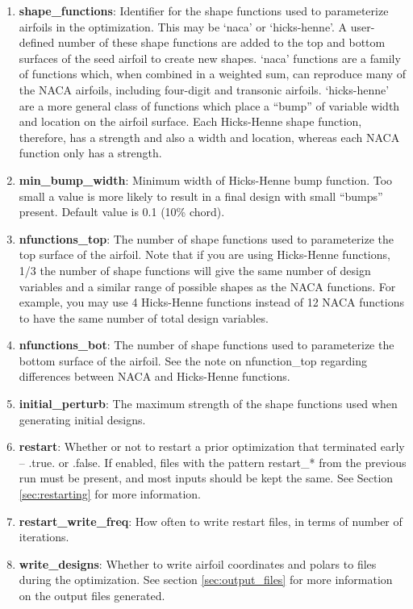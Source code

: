 \documentclass[11pt]{article}
\begin{document}
\begin{enumerate}
{as a percentage of the chord length; the second digit is for location of max camber, in
tenths of the chord length, and the last two digits are for max thickness, as a percentage
of chord length.}
\item{\textbf{shape\_functions}: Identifier for the shape functions used to parameterize
airfoils in the optimization.  This may be `naca' or `hicks-henne'.  A user-defined number
of these shape functions are added to the top and bottom surfaces of the seed airfoil to
create new shapes.  `naca' functions are a family of functions which, when combined in a
weighted sum, can reproduce many of the NACA airfoils, including four-digit and transonic
airfoils.  `hicks-henne' are a more general class of functions which place a ``bump'' of
variable width and location on the airfoil surface.  Each Hicks-Henne shape function,
therefore, has a strength and also a width and location, whereas each NACA function only
has a strength.}
\item{\textbf{min\_bump\_width}: Minimum width of Hicks-Henne bump function.  Too small a
value is more likely to result in a final design with small ``bumps'' present.  Default
value is 0.1 (10\% chord).}
\item{\textbf{nfunctions\_top}: The number of shape functions used to parameterize the top
surface of the airfoil.  Note that if you are using Hicks-Henne functions, 1/3 the
number of shape functions will give the same number of design variables and a similar range of
possible shapes as the NACA functions.  For example, you may use 4 Hicks-Henne functions
instead of 12 NACA functions to have the same number of total design variables.}
\item{\textbf{nfunctions\_bot}: The number of shape functions used to parameterize the
bottom surface of the airfoil.  See the note on nfunction\_top regarding differences
between NACA and Hicks-Henne functions.}
\item{\textbf{initial\_perturb}: The maximum strength of the shape functions used when
generating initial designs.}
\item{\textbf{restart}: Whether or not to restart a prior optimization that terminated
early -- .true. or .false.  If enabled, files with the pattern restart\_* from the 
previous run must be present, and most inputs should be kept the same. See Section 
\ref{sec:restarting} for more information.}
\item{\textbf{restart\_write\_freq}: How often to write restart files, in terms of number
of iterations.}
\item{\textbf{write\_designs}: Whether to write airfoil coordinates and polars to files
during the optimization.  See section \ref{sec:output_files} for more information on the
output files generated.}
\end{enumerate}
\end{document}
